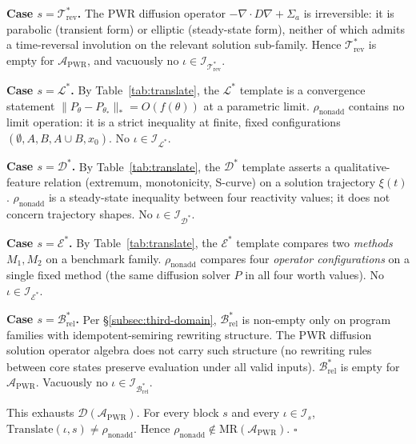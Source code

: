 \documentclass[acmsmall, screen]{acmart}
\begin{document}
\textbf{Case $s = \mathcal{T}_{\mathrm{rev}}^{*}$.} The PWR diffusion operator $-\nabla \cdot D \nabla + \Sigma_{a}$ is irreversible: it is parabolic (transient form) or elliptic (steady-state form), neither of which admits a time-reversal involution on the relevant solution sub-family. Hence $\mathcal{T}_{\mathrm{rev}}^{*}$ is empty for $\mathcal{A}_{\mathrm{PWR}}$, and vacuously no $\iota \in \mathcal{I}_{\mathcal{T}_{\mathrm{rev}}^{*}}$.

\textbf{Case $s = \mathcal{L}^{*}$.} By Table~\ref{tab:translate}, the $\mathcal{L}^{*}$ template is a convergence statement $\|P_{\theta} - P_{\theta_{*}}\|_{*} = O(f(\theta))$ at a parametric limit. $\rho_{\mathrm{nonadd}}$ contains no limit operation: it is a strict inequality at finite, fixed configurations $(\emptyset, A, B, A \cup B, x_{0})$. No $\iota \in \mathcal{I}_{\mathcal{L}^{*}}$.

\textbf{Case $s = \mathcal{D}^{*}$.} By Table~\ref{tab:translate}, the $\mathcal{D}^{*}$ template asserts a qualitative-feature relation (extremum, monotonicity, S-curve) on a solution trajectory $\xi(t)$. $\rho_{\mathrm{nonadd}}$ is a steady-state inequality between four reactivity values; it does not concern trajectory shapes. No $\iota \in \mathcal{I}_{\mathcal{D}^{*}}$.

\textbf{Case $s = \mathcal{E}^{*}$.} By Table~\ref{tab:translate}, the $\mathcal{E}^{*}$ template compares two \emph{methods} $M_{1}, M_{2}$ on a benchmark family. $\rho_{\mathrm{nonadd}}$ compares four \emph{operator configurations} on a single fixed method (the same diffusion solver $P$ in all four worth values). No $\iota \in \mathcal{I}_{\mathcal{E}^{*}}$.

\textbf{Case $s = \mathcal{B}_{\mathrm{rel}}^{*}$.} Per \S\ref{subsec:third-domain}, $\mathcal{B}_{\mathrm{rel}}^{*}$ is non-empty only on program families with idempotent-semiring rewriting structure. The PWR diffusion solution operator algebra does not carry such structure (no rewriting rules between core states preserve evaluation under all valid inputs). $\mathcal{B}_{\mathrm{rel}}^{*}$ is empty for $\mathcal{A}_{\mathrm{PWR}}$. Vacuously no $\iota \in \mathcal{I}_{\mathcal{B}_{\mathrm{rel}}^{*}}$.

This exhausts $\mathcal{D}(\mathcal{A}_{\mathrm{PWR}})$. For every block $s$ and every $\iota \in \mathcal{I}_{s}$, $\mathrm{Translate}(\iota, s) \neq \rho_{\mathrm{nonadd}}$. Hence $\rho_{\mathrm{nonadd}} \notin \mathrm{MR}(\mathcal{A}_{\mathrm{PWR}})$. \hfill$\square$
\end{document}
